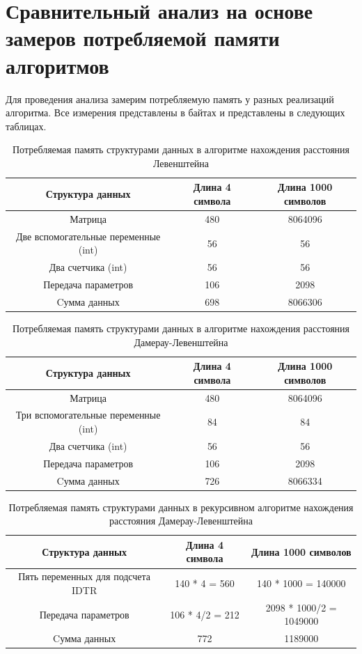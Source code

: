 \documentclass[12pt]{report}
\begin{document}
\section{Сравнительный анализ на основе замеров потребляемой памяти алгоритмов}
\par Для проведения анализа замерим потребляемую память у разных реализаций алгоритма. Все измерения представлены в байтах и представлены в следующих таблицах.

\begin{table} [h!]
\centering
\caption{Потребляемая память структурами данных в алгоритме нахождения расстояния Левенштейна}
	\begin{tabular}{|c c c|} 
 	\hline
	Структура данных & Длина 4 символа & Длина 1000 символов\\ [0.8ex] 
 	\hline\hline
 	Матрица & 480 & 8064096\\
 	\hline
 	Две вспомогательные переменные (int) & 56 & 56\\
 	\hline
	Два счетчика (int) & 56 & 56\\
	\hline
	Передача параметров & 106 & 2098\\
	\hline
	Cумма данных & 698 & 8066306\\
	\hline
	\end{tabular}
\end{table}

\begin{table} [h!]
\centering
\caption{Потребляемая память структурами данных в алгоритме нахождения расстояния Дамерау-Левенштейна}
	\begin{tabular}{|c c c|} 
 	\hline
	Структура данных & Длина 4 символа & Длина 1000 символов\\ [0.8ex] 
 	\hline\hline
 	Матрица & 480 & 8064096\\
 	\hline
 	Три вспомогательные переменные (int) & 84 & 84\\
 	\hline
	Два счетчика (int) & 56 & 56\\
	\hline
	Передача параметров & 106 & 2098\\
	\hline
	Cумма данных & 726 & 8066334\\
	\hline
	\end{tabular}
\end{table}

\begin{table} [h!]
\centering
\caption{Потребляемая память структурами данных в рекурсивном алгоритме нахождения расстояния Дамерау-Левенштейна}
	\begin{tabular}{|c c c|} 
 	\hline
	Структура данных & Длина 4 символа & Длина 1000 символов\\ [0.8ex] 
 	\hline\hline
 	Пять переменных для подсчета IDTR & 140 * 4 = 560 & 140 * 1000 = 140000\\
 	\hline
	Передача параметров & 106 * 4/2 = 212 & 2098 * 1000/2 = 1049000\\
	\hline
	Cумма данных & 772 & 1189000\\
	\hline
	\end{tabular}
\end{table}
\end{document}
